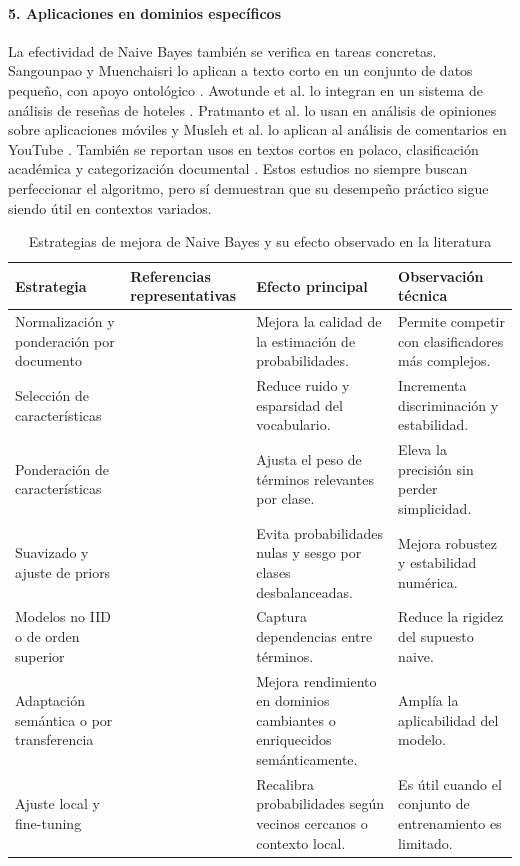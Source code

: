 \paragraph{5. Aplicaciones en dominios específicos}

La efectividad de Naive Bayes también se verifica en tareas concretas. Sangounpao y Muenchaisri lo aplican a texto corto en un conjunto de datos pequeño, con apoyo ontológico \cite{Sangounpao2019}. Awotunde et al. lo integran en un sistema de análisis de reseñas de hoteles \cite{Awotunde2023131}. Pratmanto et al. lo usan en análisis de opiniones sobre aplicaciones móviles y Musleh et al. lo aplican al análisis de comentarios en YouTube \cite{Pratmanto2020,Musleh2023}. También se reportan usos en textos cortos en polaco, clasificación académica y categorización documental \cite{Wawer20191321,Humaidi2023,Wang2007,Mendoza2011251}. Estos estudios no siempre buscan perfeccionar el algoritmo, pero sí demuestran que su desempeño práctico sigue siendo útil en contextos variados.

\begin{table}[H]
\centering
\caption{Estrategias de mejora de Naive Bayes y su efecto observado en la literatura}
\label{tab:mejoras}
\small
\begin{tabularx}{\textwidth}{|L{4.1cm}|L{3.5cm}|X|X|}
\hline
\textbf{Estrategia} & \textbf{Referencias representativas} & \textbf{Efecto principal} & \textbf{Observación técnica} \\ \hline
Normalización y ponderación por documento & \cite{Kim2006,10.1007/978-3-540-30549-1_43} & Mejora la calidad de la estimación de probabilidades. & Permite competir con clasificadores más complejos. \\ \hline
Selección de características & \cite{CHEN20095432,YOUN2009477,Tang20162508} & Reduce ruido y esparsidad del vocabulario. & Incrementa discriminación y estabilidad. \\ \hline
Ponderación de características & \cite{Jiang2016,ZHANG2016137,Ruan202020151} & Ajusta el peso de términos relevantes por clase. & Eleva la precisión sin perder simplicidad. \\ \hline
Suavizado y ajuste de priors & \cite{Frank2006,10.1007/978-3-540-71496-5_73} & Evita probabilidades nulas y sesgo por clases desbalanceadas. & Mejora robustez y estabilidad numérica. \\ \hline
Modelos no IID o de orden superior & \cite{Ganiz20111022,4554061,Gan2021} & Captura dependencias entre términos. & Reduce la rigidez del supuesto naive. \\ \hline
Adaptación semántica o por transferencia & \cite{KIM2018128,10.5555/1619645.1619732} & Mejora rendimiento en dominios cambiantes o enriquecidos semánticamente. & Amplía la aplicabilidad del modelo. \\ \hline
Ajuste local y fine-tuning & \cite{ELHINDI2020106652} & Recalibra probabilidades según vecinos cercanos o contexto local. & Es útil cuando el conjunto de entrenamiento es limitado. \\ \hline
\end{tabularx}
\end{table}

